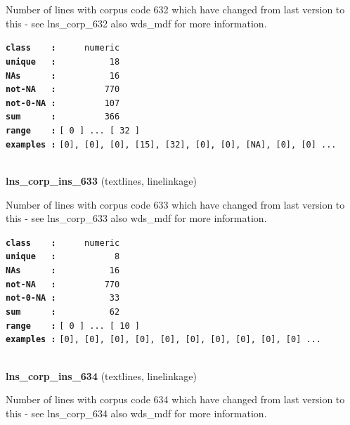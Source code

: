 \documentclass[]{article}
\begin{document}
Number of lines with corpus code 632 which have changed from last
version to this - see lns\_corp\_632 also wds\_mdf for more information.

\textbf{\texttt{class\ \ \ \ :}} \texttt{~~~~~numeric}\\
\textbf{\texttt{unique\ \ \ :}} \texttt{~~~~~~~~~~18}\\
\textbf{\texttt{NAs\ \ \ \ \ \ :}} \texttt{~~~~~~~~~~16}\\
\textbf{\texttt{not-NA\ \ \ :}} \texttt{~~~~~~~~~770}\\
\textbf{\texttt{not-0-NA\ :}} \texttt{~~~~~~~~~107}\\
\textbf{\texttt{sum\ \ \ \ \ \ :}} \texttt{~~~~~~~~~366}\\
\textbf{\texttt{range\ \ \ \ :}}
\texttt{{[}\ 0\ {]}\ ...\ {[}\ 32\ {]}}\\
\textbf{\texttt{examples\ :}}
\texttt{{[}0{]},\ {[}0{]},\ {[}0{]},\ {[}15{]},\ {[}32{]},\ {[}0{]},\ {[}0{]},\ {[}NA{]},\ {[}0{]},\ {[}0{]}\ ...}\\

~

\textbf{lns\_corp\_ins\_633} (textlines, linelinkage)

Number of lines with corpus code 633 which have changed from last
version to this - see lns\_corp\_633 also wds\_mdf for more information.

\textbf{\texttt{class\ \ \ \ :}} \texttt{~~~~~numeric}\\
\textbf{\texttt{unique\ \ \ :}} \texttt{~~~~~~~~~~~8}\\
\textbf{\texttt{NAs\ \ \ \ \ \ :}} \texttt{~~~~~~~~~~16}\\
\textbf{\texttt{not-NA\ \ \ :}} \texttt{~~~~~~~~~770}\\
\textbf{\texttt{not-0-NA\ :}} \texttt{~~~~~~~~~~33}\\
\textbf{\texttt{sum\ \ \ \ \ \ :}} \texttt{~~~~~~~~~~62}\\
\textbf{\texttt{range\ \ \ \ :}}
\texttt{{[}\ 0\ {]}\ ...\ {[}\ 10\ {]}}\\
\textbf{\texttt{examples\ :}}
\texttt{{[}0{]},\ {[}0{]},\ {[}0{]},\ {[}0{]},\ {[}0{]},\ {[}0{]},\ {[}0{]},\ {[}0{]},\ {[}0{]},\ {[}0{]}\ ...}\\

~

\textbf{lns\_corp\_ins\_634} (textlines, linelinkage)

Number of lines with corpus code 634 which have changed from last
version to this - see lns\_corp\_634 also wds\_mdf for more information.
\end{document}
